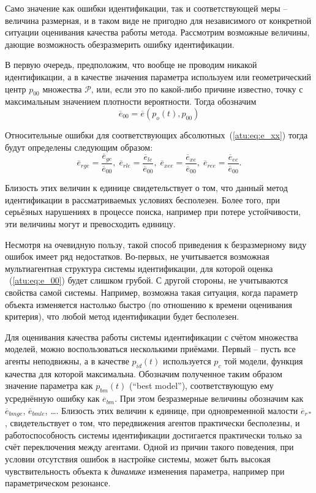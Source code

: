 Само значение как ошибки идентификации, так и соответствующей меры -- величина размерная,
и в таком виде не пригодно для
независимого от конкретной ситуации оценивания качества работы метода.
Рассмотрим возможные величины, дающие возможность обезразмерить ошибку идентификации.

В первую очередь, предположим, что вообще не проводим никакой идентификации,
а в качестве значения параметра используем или геометрический центр $p_{00}$ множества $\mathcal{P}$,
или, если это по какой-либо причине известно, точку с максимальным значением плотности вероятности.
Тогда обозначим
%
\begin{equation}
  \overline{e}_{00}
  =
  \overline{e}(p_o(t),p_{00})
  \label{atu:eq:e_00}
\end{equation}

Относительные ошибки для соответствующих абсолютных~(\ref{atu:eq:e_xx})
тогда будут определены следующим образом:
%
\begin{equation}
  \overline{e}_{rge} = \frac{\overline{e}_{ge}}{\overline{e}_{00}}, \;
  \overline{e}_{rle} = \frac{\overline{e}_{le}}{\overline{e}_{00}}, \;
  \overline{e}_{xee} = \frac{\overline{e}_{xe}}{\overline{e}_{00}}, \;
  \overline{e}_{ree} = \frac{\overline{e}_{ee}}{\overline{e}_{00}}.
  \label{atu:eq:e_rxx}
\end{equation}

Близость этих величин к единице свидетельствует о том, что
данный метод идентификации в рассматриваемых условиях бесполезен.
Более того, при серьёзных нарушениях в процессе поиска,
например при потере устойчивости, эти величины могут и превосходить единицу.

Несмотря на очевидную пользу, такой способ приведения к безразмерному виду ошибок
имеет ряд недостатков. Во-первых,
не учитывается возможная мультиагентная структура системы идентификации,
для которой оценка ~(\ref{atu:eq:e_00}) будет слишком грубой.
С другой стороны,
не учитываются свойства
самой системы. Например, возможна такая ситуация, когда параметр
объекта изменяется настолько быстро (по отношению к времени оценивания критерия),
что любой метод идентификации будет бесполезен.

Для оценивания качества работы системы идентификации с счётом
множества моделей, можно воспользоваться несколькими приёмами.
Первый -- пусть все агенты неподвижны, а в качестве $p_{id}(t)$
используется $p_c$ той модели, функция качества для которой
максимальна. Обозначим полученное таким образом значение
параметра как $p_{bm}(t)$ (``best model''),
соответствующую ему усреднённую ошибку как $\overline{e}_{bm}$.
При этом безразмерные величины обозначим как
$\overline{e}_{bmge}$, $\overline{e}_{bmle}$,  \ldots.
Близость этих величин к единице, при одновременной малости
$\overline{e}_{r*}$, свидетельствует о том, что передвижения
агентов практически бесполезны, и работоспособность системы идентификации достигается
практически только за счёт переключения между агентами.
Одной из причин такого поведения, при условии отсутствия ошибок
в настройке системы, может быть высокая чувствительность
объекта к \textit{динамике} изменения параметра, например
при параметрическом резонансе.


